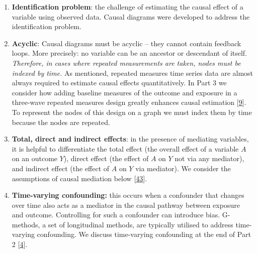 \documentclass[
  singlecolumn]{article}
\begin{document}
\begin{enumerate}
\def\labelenumi{\arabic{enumi}.}
\setcounter{enumi}{11}
\item
  \textbf{Identification problem}: the challenge of estimating the
  causal effect of a variable using observed data. Causal diagrams were
  developed to address the identification problem.
\item
  \textbf{Acyclic}: Causal diagrams must be acyclic -- they cannot
  contain feedback loops. More precisely: no variable can be an ancestor
  or descendant of itself. \emph{Therefore, in cases where repeated
  measurements are taken, nodes must be indexed by time.} As mentioned,
  repeated measures time series data are almost always required to
  estimate causal effects quantitatively. In Part 3 we consider how
  adding baseline measures of the outcome and exposure in a three-wave
  repeated measures design greatly enhances causal estimation
  {[}\protect\hyperlink{ref-pearl2009}{9}{]}. To represent the nodes of
  this design on a graph we must index them by time because the nodes
  are repeated.
\item
  \textbf{Total, direct and indirect effects}: in the presence of
  mediating variables, it is helpful to differentiate the total effect
  (the overall effect of a variable \(A\) on an outcome \(Y\)), direct
  effect (the effect of \(A\) on \(Y\) not via any mediator), and
  indirect effect (the effect of \(A\) on \(Y\) via mediator). We
  consider the assumptions of causal mediation below
  {[}\protect\hyperlink{ref-vanderweele2015}{43}{]}.
\item
  \textbf{Time-varying confounding:} this occurs when a confounder that
  changes over time also acts as a mediator in the causal pathway
  between exposure and outcome. Controlling for such a confounder can
  introduce bias. G-methods, a set of longitudinal methods, are
  typically utilised to address time-varying confounding. We discuss
  time-varying confounding at the end of Part 2
  {[}\protect\hyperlink{ref-hernuxe1n2023}{4}{]}.
\end{enumerate}
\end{document}
